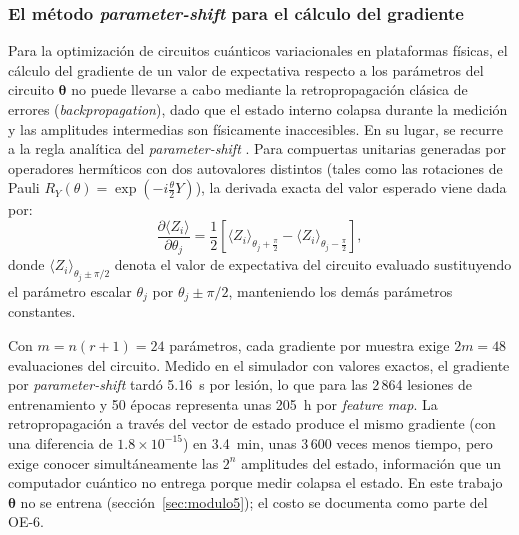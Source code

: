 
\subsubsection{El método \textit{parameter-shift} para el cálculo del gradiente}
\label{sec:parameter_shift}

Para la optimización de circuitos cuánticos variacionales en plataformas físicas, el
cálculo del gradiente de un valor de expectativa respecto a los parámetros del circuito
$\boldsymbol{\theta}$ no puede llevarse a cabo mediante la retropropagación clásica de
errores (\textit{backpropagation}), dado que el estado interno colapsa durante la medición
y las amplitudes intermedias son físicamente inaccesibles. En su lugar, se recurre a la
regla analítica del \textit{parameter-shift} \cite{mitarai2018quantum, cerezo2021variational}.
Para compuertas unitarias generadas por operadores hermíticos con dos autovalores
distintos (tales como las rotaciones de Pauli $R_Y(\theta) = \exp(-i \frac{\theta}{2} Y)$),
la derivada exacta del valor esperado viene dada por:
\begin{equation}
  \frac{\partial \langle Z_i \rangle}{\partial \theta_j} =
  \frac{1}{2}\left[
    \langle Z_i \rangle_{\theta_j + \frac{\pi}{2}} -
    \langle Z_i \rangle_{\theta_j - \frac{\pi}{2}}
  \right],
  \label{eq:parameter_shift}
\end{equation}
donde $\langle Z_i \rangle_{\theta_j \pm \pi/2}$ denota el valor de expectativa del circuito
evaluado sustituyendo el parámetro escalar $\theta_j$ por $\theta_j \pm \pi/2$, manteniendo
los demás parámetros constantes.

Con $m = n(r+1) = 24$ parámetros, cada gradiente por muestra exige $2m = 48$ evaluaciones del circuito. Medido en el simulador con valores exactos, el gradiente por \textit{parameter-shift} tardó 5.16~s por lesión, lo que para las 2\,864 lesiones de entrenamiento y 50 épocas representa unas 205~h por \textit{feature map}. La retropropagación a través del vector de estado produce el mismo gradiente (con una diferencia de $1.8\times10^{-15}$) en 3.4~min, unas 3\,600 veces menos tiempo, pero exige conocer simultáneamente las $2^n$ amplitudes del estado, información que un computador cuántico no entrega porque medir colapsa el estado. En este trabajo $\boldsymbol{\theta}$ no se entrena (sección~\ref{sec:modulo5}); el costo se documenta como parte del OE-6.
